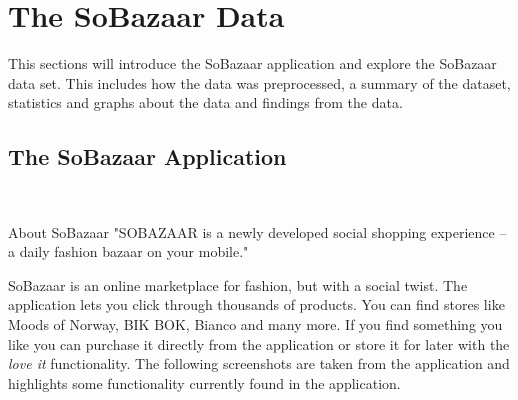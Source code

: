 
\chapter{The SoBazaar Data}
\label{sobazaar-data}
\minitoc

    This sections will introduce the SoBazaar application and explore the SoBazaar data set.
    This includes how the data was preprocessed, a summary of the dataset, statistics and graphs about the data and findings from the data.


	\section{The SoBazaar Application}\mbox{}\\

	\begin{chapquote}[30pt]{About SoBazaar}
	  "SOBAZAAR is a newly developed social shopping experience – a daily fashion bazaar on your mobile."
	\end{chapquote}

	SoBazaar is an online marketplace for fashion, but with a social twist. The application lets you click through thousands of products. You can find stores like Moods of Norway, BIK BOK, Bianco and many more. If you find something you like you can purchase it directly from the application or store it for later with the \emph{love it} functionality.
	The following screenshots are taken from the application and highlights some functionality currently found in the
	application.

